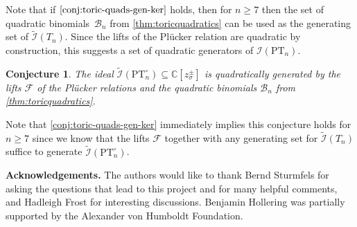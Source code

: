\documentclass[12pt, reqno]{amsart}
\numberwithin{equation}{section}
\theoremstyle{plain}
\newtheorem{conjecture}[theorem]{Conjecture}
\theoremstyle{definition}
\newcommand{\cc}{\mathbb{C}}
\newcommand{\ci}{\mathcal{I}}
\newcommand{\cb}{\mathcal{B}}
\newcommand{\pt}{\mathrm{PT}}
\begin{document}
Note that if $\cref{conj:toric-quads-gen-ker}$ holds, then for $n \geq 7$ then the set of quadratic binomials~$\cb_n$ from \cref{thm:toricquadratics} can be used as the generating set of $\tilde{\ci}(T_n)$. Since the lifts of the Pl\"ucker relation are quadratic by construction, this suggests a set of quadratic generators of $\ci(\pt_n)$. 


\begin{conjecture}
The ideal $\tilde{\ci}(\pt_n^\circ) \subseteq \cc[z_\sigma^\pm]$ is quadratically generated by the lifts $\mathcal{F}$ of the Pl\"ucker relations and the quadratic binomials $\cb_n$ from \cref{thm:toricquadratics}.  
\end{conjecture}

Note that \cref{conj:toric-quads-gen-ker} immediately implies this conjecture holds for $n \geq 7$ since we know that the lifts $\mathcal{F}$ together with any generating set for $\tilde{\ci}(T_n)$ suffice to generate $\tilde{\ci}(\pt_n^\circ)$. 

\medskip
\noindent\textbf{Acknowledgements.} The authors would like to thank Bernd Sturmfels for asking the questions that lead to this project and for many helpful comments, and Hadleigh Frost for interesting discussions. Benjamin Hollering was partially supported by the Alexander von Humboldt Foundation. 



\end{document}

